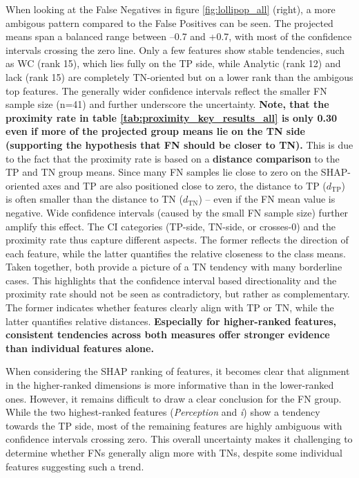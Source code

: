 When looking at the False Negatives in figure \ref{fig:lollipop_all} (right), a more ambigous pattern  compared to the False Positives can be seen. The projected means span a balanced range between –0.7 and +0.7, with most of the confidence intervals crossing the zero line. Only a few features show stable tendencies, such as WC (rank 15), which lies fully on the TP side, while Analytic (rank 12) and lack (rank 15) are completely TN-oriented but on a lower rank than the ambigous top features. The generally wider confidence intervals reflect the smaller FN sample size (n=41) and further underscore the uncertainty.
\textbf{Note, that the proximity rate in table \ref{tab:proximity_key_results_all} is only 0.30 even if more of the projected group means lie on the TN side (supporting the hypothesis that FN should be closer to TN).} This is due to the fact that the proximity rate is based on a \textbf{distance comparison} to the TP and TN group means. Since many FN samples lie close to zero on the SHAP-oriented axes and TP are also positioned close to zero, the distance to TP ($d_{\mathrm{TP}}$) is often smaller than the distance to TN ($d_{\mathrm{TN}}$) – even if the FN mean value is negative. Wide confidence intervals (caused by the small FN sample size) further amplify this effect. The CI categories (TP-side, TN-side, or crosses-0) and the proximity rate thus capture different aspects. The former reflects the direction of each feature, while the latter quantifies the relative closeness to the class means. Taken together, both provide a picture of a TN tendency with many borderline cases. This highlights that the confidence interval based directionality and the proximity rate should not be seen as contradictory, but rather as complementary. The former indicates whether features clearly align with TP or TN, while the latter quantifies relative distances. \textbf{Especially for higher-ranked features, consistent tendencies across both measures offer stronger evidence than individual features alone.}

When considering the SHAP ranking of features, it becomes clear that alignment in the higher-ranked dimensions is more informative than in the lower-ranked ones. However, it remains difficult to draw a clear conclusion for the FN group. While the two highest-ranked features (\textit{Perception} and \textit{i}) show a tendency towards the TP side, most of the remaining features are highly ambiguous with confidence intervals crossing zero. This overall uncertainty makes it challenging to determine whether FNs generally align more with TNs, despite some individual features suggesting such a trend.

